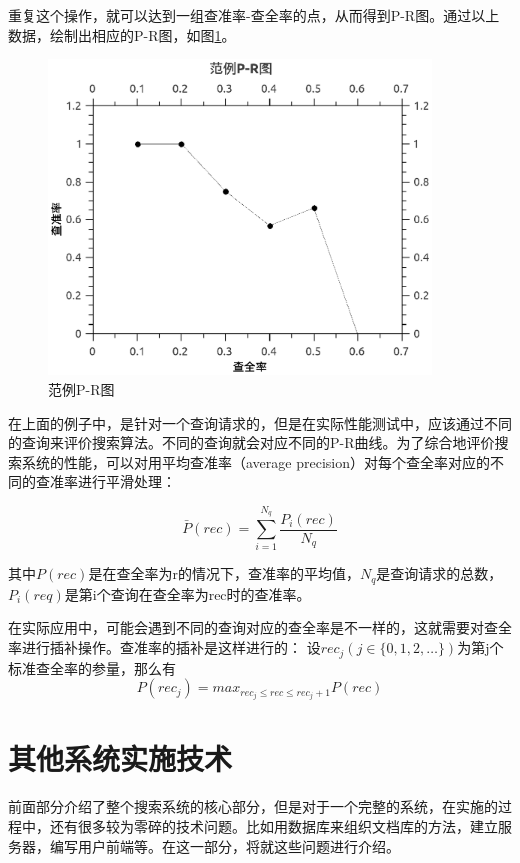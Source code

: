 \documentclass[12pt,a4paper]{article}
\begin{document}
	重复这个操作，就可以达到一组查准率-查全率的点，从而得到P-R图。通过以上数据，绘制出相应的P-R图，如图\ref{fig:p-rFigure}。
	\begin{figure}[htbp] 
	\centering\includegraphics[width=4in]{fig/prFigureExample.eps} 
	\caption{范例P-R图}\label{fig:p-rFigure} 
	\end{figure} 
	
	在上面的例子中，是针对一个查询请求的，但是在实际性能测试中，应该通过不同的查询来评价搜索算法。不同的查询就会对应不同的P-R曲线。为了综合地评价搜索系统的性能，可以对用平均查准率（average precision）对每个查全率对应的不同的查准率进行平滑处理：
	
	\begin{equation}\label{eq:average precision}
	\bar{P}(rec) = \sum_{i=1}^{N_q} \frac{P_i(rec)}{N_q}
	\end{equation}
	
	其中$ {P}(rec) $是在查全率为r的情况下，查准率的平均值，$ N_q $是查询请求的总数，$ P_i(req) $是第i个查询在查全率为rec时的查准率。
	
	在实际应用中，可能会遇到不同的查询对应的查全率是不一样的，这就需要对查全率进行插补操作。查准率的插补是这样进行的：
	设$rec_j (j \in \{0,1,2,\dots\} )$为第j个标准查全率的参量，那么有
	\begin{equation}\label{eq:插补}
	P(rec_j) = max_{rec_j \leq rec \leq rec_j+1}P(rec)
	\end{equation}
	
\newpage
\section{其他系统实施技术}
\setcounter{figure}{0}
\setcounter{table}{0}
\setcounter{equation}{0}
	前面部分介绍了整个搜索系统的核心部分，但是对于一个完整的系统，在实施的过程中，还有很多较为零碎的技术问题。比如用数据库来组织文档库的方法，建立服务器，编写用户前端等。在这一部分，将就这些问题进行介绍。
\end{document}
